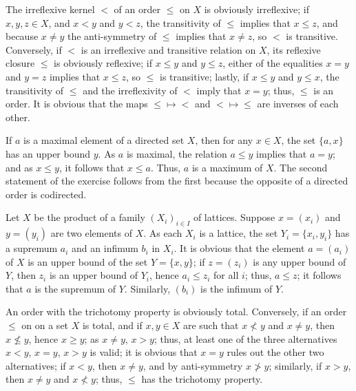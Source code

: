 \documentclass{article}
\begin{document}
\begin{solution}[\ref{exe:eydusvz3}]
  \label{sol:bxkmo56h}
  The irreflexive kernel \(<\) of an order \(\leq\) on \(X\) is
  obviously irreflexive; if \(x,y,z \in X\), and \(x < y\) and
  \(y < z\), the transitivity of \(\leq\) implies that \(x \leq z\),
  and because \(x \neq y\) the anti-symmetry of \(\leq\) implies that
  \(x \neq z\), so \(<\) is transitive.  Conversely, if \(<\) is an
  irreflexive and transitive relation on \(X\), its reflexive closure
  \(\leq\) is obviously reflexive; if \(x \leq y\) and \(y \leq z\),
  either of the equalities \(x = y\) and \(y = z\) implies that
  \(x \leq z\), so \(\leq\) is transitive; lastly, if \(x \leq y\) and
  \(y \leq x\), the transitivity of \(\leq\) and the irreflexivity of
  \(<\) imply that \(x = y\); thus, \(\leq\) is an order.  It is
  obvious that the maps \(\leq \mapsto <\) and \(< \mapsto \leq\) are
  inverses of each other.
\end{solution}

\begin{solution}[\ref{exe:swjbrepg}]
  \label{sol:pcqde5hb}
  If \(a\) is a maximal element of a directed set \(X\), then for any
  \(x \in X\), the set \(\{ a, x \}\) has an upper bound \(y\).  As
  \(a\) is maximal, the relation \(a \leq y\) implies that \(a = y\);
  and as \(x \leq y\), it follows that \(x \leq a\).  Thus, \(a\) is a
  maximum of \(X\).  The second statement of the exercise follows from
  the first because the opposite of a directed order is codirected.
\end{solution}

\begin{solution}[\ref{exe:yowl3axc}]
  \label{sol:rfwhck5v}
  Let \(X\) be the product of a family \((X_i)_{i \in I}\) of
  lattices.  Suppose \(x = (x_i)\) and \(y = (y_i)\) are two elements
  of \(X\).  As each \(X_i\) is a lattice, the set
  \(Y_i = \{ x_i, y_i \}\) has a supremum \(a_i\) and an infimum
  \(b_i\) in \(X_i\).  It is obvious that the element \(a = (a_i)\) of
  \(X\) is an upper bound of the set \(Y = \{ x, y \}\); if
  \(z = (z_i)\) is any upper bound of \(Y\), then \(z_i\) is an upper
  bound of \(Y_i\), hence \(a_i \leq z_i\) for all \(i\); thus,
  \(a \leq z\); it follows that \(a\) is the supremum of \(Y\).
  Similarly, \((b_i)\) is the infimum of \(Y\).
\end{solution}

\begin{solution}[\ref{exe:4knqif5b}]
  \label{sol:ien6orgc}
  An order with the trichotomy property is obviously total.
  Conversely, if an order \(\leq\) on on a set \(X\) is total, and if
  \(x,y \in X\) are such that \(x \nless y\) and \(x \neq y\), then
  \(x \nleq y\), hence \(x \geq y\); as \(x \neq y\), \(x > y\); thus,
  at least one of the three alternatives \(x < y\), \(x = y\),
  \(x > y\) is valid; it is obvious that \(x = y\) rules out the other
  two alternatives; if \(x < y\), then \(x \neq y\), and by
  anti-symmetry \(x \ngtr y\); similarly, if \(x > y\), then
  \(x \neq y\) and \(x \nless y\); thus, \(\leq\) has the trichotomy
  property.
\end{solution}
\end{document}
